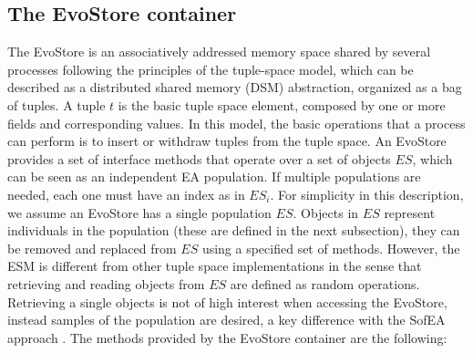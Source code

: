 \subsection{The EvoStore container}
\label{sss:container}
The EvoStore is an associatively addressed memory space shared by several processes following the principles of the tuple-space model, which can be described as a distributed shared memory (DSM) abstraction, organized as a bag of tuples.
A tuple $t$ is the basic tuple space element, composed by one or more fields and corresponding values. In this model, the basic operations that a process can perform is to insert or withdraw tuples from the tuple space. %
An EvoStore provides a set of interface methods that operate over a set of objects $ES$, which can be seen as an independent EA population. If multiple populations are needed, each one must have an index as in $ES_i$. For simplicity in this description, we assume an EvoStore has a single population $ES$. Objects in $ES$ represent individuals in the population (these are defined in the next subsection), they can be removed and replaced from $ES$ using a specified set of methods. However, the ESM is different from other tuple space implementations in the sense that retrieving and reading objects from $ES$ are defined as random operations. Retrieving a single objects is not of high interest when accessing the EvoStore, instead samples of the population are desired, a key difference with the SofEA approach \cite{sofea1,sofea2,sofea3}.
The methods provided by the EvoStore container are the following:

